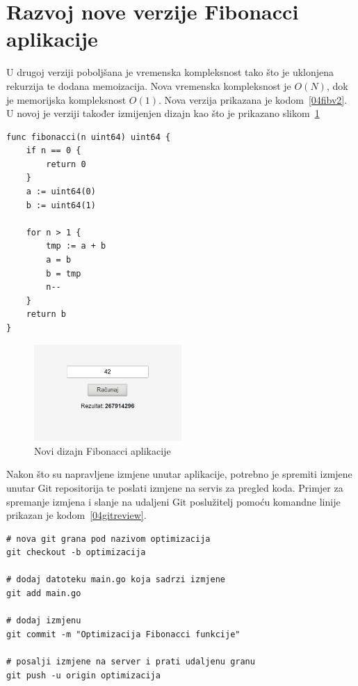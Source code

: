 \section{Razvoj nove verzije Fibonacci aplikacije}
U drugoj verziji poboljšana je vremenska kompleksnost tako što je uklonjena rekurzija te dodana
memoizacija. Nova vremenska kompleksnost je $O(N)$, dok je memorijska kompleksnost $O(1)$. Nova
verzija prikazana je kodom~\ref{04fibv2}. U novoj je verziji također izmijenjen dizajn kao što je
prikazano slikom~\ref{fig:04redesign}

\begin{lstlisting}[float=h]
func fibonacci(n uint64) uint64 {
	if n == 0 {
		return 0
	}
	a := uint64(0)
	b := uint64(1)

	for n > 1 {
		tmp := a + b
		a = b
		b = tmp
		n--
	}
	return b
}
\end{lstlisting}

\begin{figure}[h]
    \centering
    \includegraphics[width=0.5\textwidth]{img/04/new_app.png}
    \caption{Novi dizajn Fibonacci aplikacije}%
    \label{fig:04redesign}
\end{figure}

Nakon što su napravljene izmjene unutar aplikacije, potrebno je spremiti izmjene unutar Git
repositorija te poslati izmjene na servis za pregled koda. Primjer za spremanje izmjena i slanje na
udaljeni Git poslužitelj pomoću komandne linije prikazan je kodom~\ref{04gitreview}.

\begin{lstlisting}[float=h]
# nova git grana pod nazivom optimizacija
git checkout -b optimizacija

# dodaj datoteku main.go koja sadrzi izmjene
git add main.go

# dodaj izmjenu
git commit -m "Optimizacija Fibonacci funkcije"

# posalji izmjene na server i prati udaljenu granu
git push -u origin optimizacija
\end{lstlisting}

